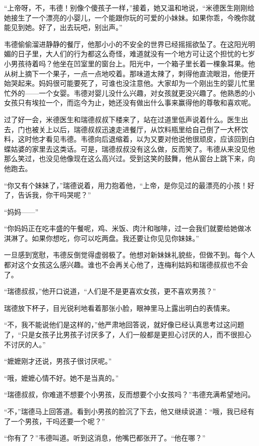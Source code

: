 \par “上帝呀，不，韦德！别像个傻孩子一样，”接着，她又温和地说，“米德医生刚刚给她接生了一个漂亮的小婴儿，一个能跟你玩的可爱的小妹妹。如果你乖，今晚你就能见到她。好了，出去玩吧，别出声。”
\par 韦德偷偷溜进静静的餐厅，他那小小的不安全的世界已经摇摇欲坠了。在这阳光明媚的日子里，大人们的行为都这么奇怪，难道就没有一个地方可让这个担忧的七岁小男孩待着吗？他坐在凹室里的窗台上。阳光中，一个箱子里长着一棵象耳果。他从树上摘下一个果子，一点一点地咬着。那味道太辣了，刺得他直流眼泪，他便开始哭起来。妈妈很可能要死了，可谁也没注意他。大家却为一个刚出生的婴儿忙里忙外的——一个女婴。韦德对婴儿没什么兴趣，对女孩就更没兴趣了。他熟悉的小女孩只有埃拉一个，而迄今为止，她还没有做出什么事来赢得他的尊敬和喜欢呢。
\par 过了好一会，米德医生和瑞德叔叔下楼来了，站在过道里低声说着什么。医生出去，门也被关上以后，瑞德叔叔迅速走进餐厅，从饮料瓶里给自己倒了一大杯饮料，这时他才看见韦德。韦德向后退缩着，以为又要对他说他很顽皮，应该回到白蝶姑婆的家里去这类话。可是，瑞德叔叔没有这么做，反而笑了。韦德从来没见他那么笑过，也没见他像现在这么高兴过。受到这笑的鼓舞，他从窗台上跳下来，向他跑去。
\par “你又有个妹妹了，”瑞德说着，用力抱着他，“上帝，是你见过的最漂亮的小孩！好了，告诉我，你干吗哭呢？”
\par “妈妈——”
\par “你妈妈正在吃丰盛的午餐呢，鸡、米饭、肉汁和咖啡，过一会我们就要给她做冰淇淋了。如果你想吃，你可以吃两盘。我还要让你见见你妹妹。”
\par 一旦感到宽慰，韦德反倒觉得虚弱极了。他想对新妹妹礼貌些，但做不到。每个人都对这个女孩这么感兴趣。谁也不会再关心他了，连梅利姑妈和瑞德叔叔也不会了。
\par “瑞德叔叔，”他开口说道，“人们是不是更喜欢女孩，更不喜欢男孩？”
\par 瑞德放下杯子，目光锐利地看着那张小脸，眼神里马上露出明白的表情来。
\par “不，我不能说他们是这样的，”他严肃地回答说，就好像已经认真思考过这问题了，“只是女孩子比男孩子讨厌多了，人们一般都是更担心讨厌的人，而不很担心不讨厌的人。”
\par “嬷嬷刚才还说，男孩子很讨厌呢。”
\par “哦，嬷嬷心情不好。她不是当真的。”
\par “瑞德叔叔，你难道不想要个小男孩，反而想要个小女孩吗？”韦德充满希望地问。
\par “不，”瑞德马上回答道。看到小男孩的脸沉了下去，他又继续说道：“哦，我已经有了一个男孩，干吗还要一个呢？”
\par “你有了？”韦德叫道。听到这消息，他嘴巴都张开了。“他在哪？”
